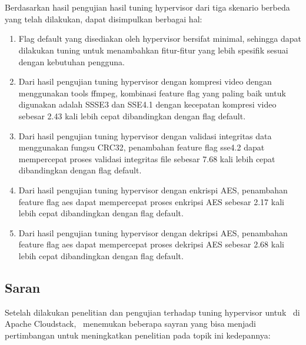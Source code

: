 \chapter{\babLima}

Berdasarkan hasil pengujian hasil tuning hypervisor dari tiga skenario berbeda yang telah dilakukan, dapat disimpulkan berbagai hal:

\begin{enumerate}
	\item Flag default yang disediakan oleh hypervisor bersifat minimal, sehingga dapat dilakukan tuning untuk menambahkan fitur-fitur yang lebih spesifik sesuai dengan kebutuhan pengguna.
	\item Dari hasil pengujian tuning hypervisor dengan kompresi video dengan menggunakan tools ffmpeg, kombinasi feature flag yang paling baik untuk digunakan adalah SSSE3 dan SSE4.1 dengan kecepatan kompresi video sebesar 2.43 kali lebih cepat dibandingkan dengan flag default.
	\item Dari hasil pengujian tuning hypervisor dengan validasi integritas data menggunakan fungsu CRC32, penambahan feature flag sse4.2 dapat mempercepat proses validasi integritas file sebesar 7.68 kali lebih cepat dibandingkan dengan flag default.
	\item Dari hasil pengujian tuning hypervisor dengan enkrispi AES, penambahan feature flag aes dapat mempercepat proses enkripsi AES sebesar 2.17 kali lebih cepat dibandingkan dengan flag default.
	\item Dari hasil pengujian tuning hypervisor dengan dekripsi AES, penambahan feature flag aes dapat mempercepat proses dekripsi AES sebesar 2.68 kali lebih cepat dibandingkan dengan flag default.
\end{enumerate}

\section{Saran}
Setelah dilakukan penelitian dan pengujian terhadap tuning hypervisor untuk \vm\ di Apache Cloudstack, \saya\ menemukan beberapa sayran yang bisa menjadi pertimbangan untuk meningkatkan penelitian pada topik ini kedepannya:

